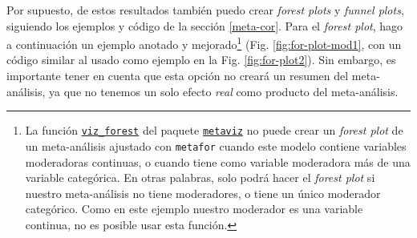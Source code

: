 \documentclass[
  bookmarksnumbered]{article}
\begin{document}
Por supuesto, de estos resultados también puedo crear \emph{forest plots} y \emph{funnel plots}, siguiendo los ejemplos y código de la sección \ref{meta-cor}. Para el \emph{forest plot}, hago a continuación un ejemplo anotado y mejorado\footnote{La función \href{https://cran.r-project.org/web/packages/metaviz/vignettes/metaviz.html\#creating-forest-plots-with-function-viz_forest}{\texttt{viz\_forest}} del paquete \href{https://cran.r-project.org/web/packages/metaviz/vignettes/metaviz.html}{\texttt{metaviz}} no puede crear un \emph{forest plot} de un meta-análisis ajustado con \texttt{metafor} cuando este modelo contiene variables moderadoras continuas, o cuando tiene como variable moderadora más de una variable categórica. En otras palabras, solo podrá hacer el \emph{forest plot} si nuestro meta-análisis no tiene moderadores, o tiene un único moderador categórico. Como en este ejemplo nuestro moderador es una variable continua, no es posible usar esta función.} (Fig. \ref{fig:for-plot-mod1}, con un código similar al usado como ejemplo en la Fig. \ref{fig:for-plot2}). Sin embargo, es importante tener en cuenta que esta opción no creará un resumen del meta-análisis, ya que no tenemos un solo efecto \emph{real} como producto del meta-análisis.
\end{document}
